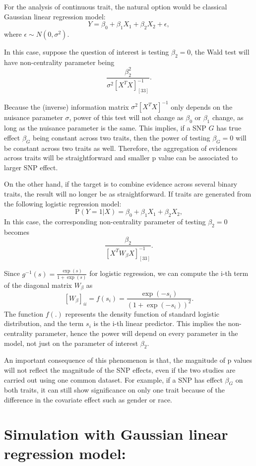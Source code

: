 \documentclass[
]{article}
\begin{document}
For the analysis of continuous trait, the natural option would be
classical Gaussian linear regression model:
\[Y = \beta_0 + \beta_1 X_1 + \beta_2X_2+\epsilon,\] where
\(\epsilon \sim N(0,\sigma^2)\).

In this case, suppose the question of interest is testing \(\beta_2=0\),
the Wald test will have non-centrality parameter being
\[\frac{\beta_2^2}{\sigma^2[X^TX]^{-1}_{[33]}}.\]

Because the (inverse) information matrix \(\sigma^2[X^TX]^{-1}\) only
depends on the nuisance parameter \(\sigma\), power of this test will
not change as \(\beta_0\) or \(\beta_1\) change, as long as the nuisance
parameter is the same. This implies, if a SNP \(G\) has true effect
\(\beta_G\) being constant across two traits, then the power of testing
\(\beta_G = 0\) will be constant across two traits as well. Therefore,
the aggregation of evidences across traits will be straightforward and
smaller p value can be associated to larger SNP effect.

On the other hand, if the target is to combine evidence across several
binary traits, the result will no longer be as straightforward. If
traits are generated from the following logistic regression model:
\[\text{P}(Y=1|X) = \beta_0 + \beta_1 X_1 + \beta_2X_2,\] In this case,
the corresponding non-centrality parameter of testing \(\beta_2=0\)
becomes \[\frac{\beta_2}{[X^TW_\beta X]^{-1}_{[33]}}.\]

Since \(g^{-1}(s)= \frac{\exp(s)}{1+\exp(s)}\) for logistic regression,
we can compute the i-th term of the diagonal matrix \(W_\beta\) as
\[[W_\beta]_{ii} = f(s_i)=\frac{\exp(-s_i)}{(1+\exp(-s_i))^2}.\] The
function \(f(.)\) represents the density function of standard logistic
distribution, and the term \(s_i\) is the i-th linear predictor. This
implies the non-centrality parameter, hence the power will depend on
every parameter in the model, not just on the parameter of interest
\(\beta_2\).

An important consequence of this phenomenon is that, the magnitude of p
values will not reflect the magnitude of the SNP effects, even if the
two studies are carried out using one common dataset. For example, if a
SNP has effect \(\beta_G\) on both traits, it can still show
significance on only one trait because of the difference in the
covariate effect such as gender or race.

\hypertarget{simulation-with-gaussian-linear-regression-model}{%
\section{Simulation with Gaussian linear regression
model:}\label{simulation-with-gaussian-linear-regression-model}}
\end{document}
